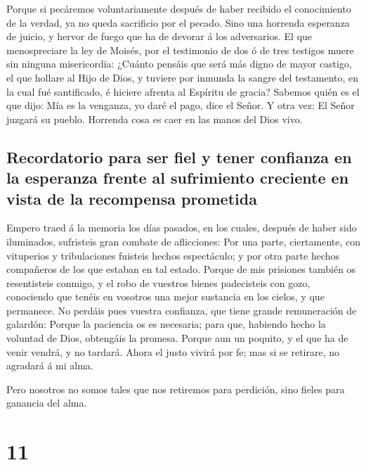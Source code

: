  Porque si pecáremos voluntariamente después de haber
recibido el conocimiento de la verdad, ya no queda sacrificio por el
pecado.  Sino una horrenda esperanza de juicio, y hervor de
fuego que ha de devorar á los adversarios.  El que
menospreciare la ley de Moisés, por el testimonio de dos ó de tres
testigos muere sin ninguna misericordia:  ¿Cuánto pensáis
que será más digno de mayor castigo, el que hollare al Hijo de Dios, y
tuviere por inmunda la sangre del testamento, en la cual fué
santificado, é hiciere afrenta al Espíritu de gracia? 
Sabemos quién es el que dijo: Mía es la venganza, yo daré el pago, dice
el Señor. Y otra vez: El Señor juzgará su pueblo.  Horrenda
cosa es caer en las manos del Dios vivo.

\hypertarget{recordatorio-para-ser-fiel-y-tener-confianza-en-la-esperanza-frente-al-sufrimiento-creciente-en-vista-de-la-recompensa-prometida}{%
\subsection{Recordatorio para ser fiel y tener confianza en la esperanza
frente al sufrimiento creciente en vista de la recompensa
prometida}\label{recordatorio-para-ser-fiel-y-tener-confianza-en-la-esperanza-frente-al-sufrimiento-creciente-en-vista-de-la-recompensa-prometida}}

 Empero traed á la memoria los días pasados, en los cuales,
después de haber sido iluminados, sufristeis gran combate de
aflicciones:  Por una parte, ciertamente, con vituperios y
tribulaciones fuisteis hechos espectáculo; y por otra parte hechos
compañeros de los que estaban en tal estado.  Porque de mis
prisiones también os resentisteis conmigo, y el robo de vuestros bienes
padecisteis con gozo, conociendo que tenéis en vosotros una mejor
sustancia en los cielos, y que permanece.  No perdáis pues
vuestra confianza, que tiene grande remuneración de galardón:
 Porque la paciencia os es necesaria; para que, habiendo
hecho la voluntad de Dios, obtengáis la promesa.  Porque
aun un poquito, y el que ha de venir vendrá, y no tardará. 
Ahora el justo vivirá por fe; mas si se retirare, no agradará á mi alma.

 Pero nosotros no somos tales que nos retiremos para
perdición, sino fieles para ganancia del alma.

\hypertarget{section-10}{%
\section{11}\label{section-10}}

